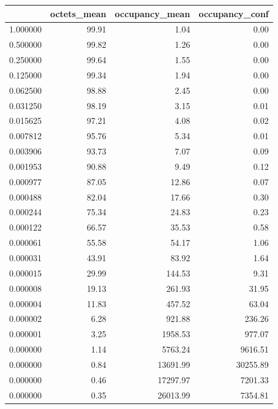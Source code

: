 \begin{tabular}{lrrr}
\toprule
 & octets_mean & occupancy_mean & occupancy_conf \\
\midrule
1.000000 & 99.91 & 1.04 & 0.00 \\
0.500000 & 99.82 & 1.26 & 0.00 \\
0.250000 & 99.64 & 1.55 & 0.00 \\
0.125000 & 99.34 & 1.94 & 0.00 \\
0.062500 & 98.88 & 2.45 & 0.00 \\
0.031250 & 98.19 & 3.15 & 0.01 \\
0.015625 & 97.21 & 4.08 & 0.02 \\
0.007812 & 95.76 & 5.34 & 0.01 \\
0.003906 & 93.73 & 7.07 & 0.09 \\
0.001953 & 90.88 & 9.49 & 0.12 \\
0.000977 & 87.05 & 12.86 & 0.07 \\
0.000488 & 82.04 & 17.66 & 0.30 \\
0.000244 & 75.34 & 24.83 & 0.23 \\
0.000122 & 66.57 & 35.53 & 0.58 \\
0.000061 & 55.58 & 54.17 & 1.06 \\
0.000031 & 43.91 & 83.92 & 1.64 \\
0.000015 & 29.99 & 144.53 & 9.31 \\
0.000008 & 19.13 & 261.93 & 31.95 \\
0.000004 & 11.83 & 457.52 & 63.04 \\
0.000002 & 6.28 & 921.88 & 236.26 \\
0.000001 & 3.25 & 1958.53 & 977.07 \\
0.000000 & 1.14 & 5763.24 & 9616.51 \\
0.000000 & 0.84 & 13691.99 & 30255.89 \\
0.000000 & 0.46 & 17297.97 & 7201.33 \\
0.000000 & 0.35 & 26013.99 & 7354.81 \\
\bottomrule
\end{tabular}
